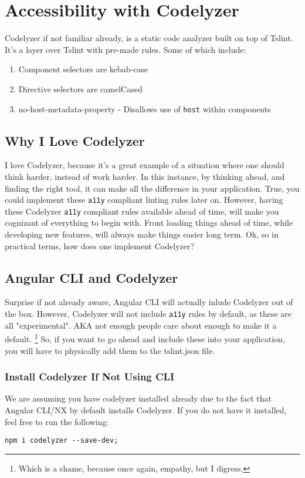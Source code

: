 \chapter{ Accessibility with Codelyzer}    
Codelyzer if not familiar already, is a static code analyzer built on top of Tslint. It's a layer over Tslint with pre-made rules. Some of which include:

\begin{enumerate}
  \item Component selectors are kebab-case
  \item Directive selectors are camelCased
  \item no-host-metadata-property - Disallows use of \lstinline{host} within components
\end{enumerate}

\section{Why I Love Codelyzer}
I love Codelyzer, because it's a great example of a situation where one should think harder, instead of work harder. In this instance, by thinking ahead, and finding the right tool, it can make all the difference in your application. True, you could implement these \lstinline{a11y} compliant linting rules later on. However, having these Codelyzer \lstinline{a11y} compliant rules available ahead of time, will make you cognizant of everything to begin with. Front loading things ahead of time, while developing new features, will always make things easier long term. Ok, so in practical terms, how does one implement Codelyzer? 

\section{Angular CLI and Codelyzer}
Surprise if not already aware, Angular CLI will actually inlude Codelyzer out of the box. However, Codelyzer will not include \lstinline{a11y} rules by default, as these are all "experimental". AKA not enough people care about enough to make it a default. \footnote{Which is a shame, because once again, empathy, but I digress.} So, if you want to go ahead and include these into your application, you will have to physically add them to the tslint.json file. 

\subsection{Install Codelyzer If Not Using CLI}
We are assuming you have codelyzer installed already due to the fact that Angular CLI/NX by default installs Codelyzer. If you do not have it installed, feel free to run the following: 
\begin{verbatim}
npm i codelyzer --save-dev;
\end{verbatim}

